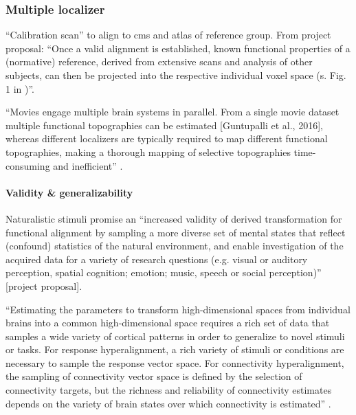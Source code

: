 


\subsubsection{Multiple localizer}

``Calibration scan'' to align to \ac{cms} and atlas of reference group.
%
From project proposal: ``Once a valid alignment is established, known functional
properties of a (normative) reference, derived from extensive scans and analysis
of other subjects, can then be projected into the respective individual voxel
space (s.  Fig. 1 in \citep{nishimoto2016lining})''.

%
``Movies engage multiple brain systems in parallel. From a single movie dataset
multiple functional topographies can be estimated [Guntupalli et al., 2016],
whereas different localizers are typically required to map different functional
topographies, making a thorough mapping of selective topographies time-consuming
and inefficient'' \citep{jiahui2020predicting}.


\paragraph{Validity \& generalizability}

Naturalistic stimuli promise an ``increased validity of derived transformation
for functional alignment by sampling a more diverse set of mental states that
reflect (confound) statistics of the natural environment, and enable
investigation of the acquired data for a variety of research questions (e.g.
visual or auditory perception, spatial cognition; emotion; music, speech or
social perception)'' [project proposal].

``Estimating the parameters to transform high-dimensional spaces from individual
brains into a common high-dimensional space requires a rich set of data that
samples a wide variety of cortical patterns in order to generalize to novel
stimuli or tasks. For response hyperalignment, a rich variety of stimuli or
conditions are necessary to sample the response vector space. For connectivity
hyperalignment, the sampling of connectivity vector space is defined by the
selection of connectivity targets, but the richness and reliability of
connectivity estimates depends on the variety of brain states over which
connectivity is estimated'' \citep{haxby2020hyperalignment}.


